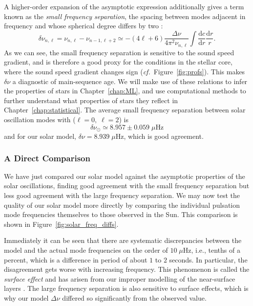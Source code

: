 A higher-order expansion of the asymptotic expression additionally gives a term known as the \emph{small frequency separation}, the spacing between modes adjacent in frequency and whose spherical degree differs by two : 
\begin{equation} \label{eq:dnu}
    \delta\nu_{n,\ell}
    =
    \nu_{n,\ell}
    -
    \nu_{n-1,\ell+2}
    \simeq
    -(4\ell + 6)
    \frac{\Delta\nu}{4\pi^2 \nu_{n,\ell}}
    \int
        \frac{\text{d}c}{\text{d}r}
        \frac{\text{d}r}{r}.
\end{equation}
As we can see, the small frequency separation is sensitive to the sound speed gradient, and is therefore a good proxy for the conditions in the stellar core, where the sound speed gradient changes sign (\emph{cf.}~Figure~\ref{fig:profs}). 
This makes ${\delta\nu}$ a diagnostic of main-sequence age. 
We will make use of these relations to infer the properties of stars in Chapter~\ref{chap:ML}, and use computational methods to further understand what properties of stars they reflect in Chapter~\ref{chap:statistical}. 
The average small frequency separation between solar oscillation modes with (${\ell=0},\;{\ell=2}$) is
\begin{equation}
    \delta\nu_\odot \simeq 8.957 \pm 0.059\;\mu\text{Hz}
\end{equation}
and for our solar model, ${\delta\nu=8.939\;\mu\text{Hz}}$, which is good agreement. 



\subsubsection*{A Direct Comparison} 
We have just compared our solar model against the asymptotic properties of the solar oscillations, finding good agreement with the small frequency separation but less good agreement with the large frequency separation. 
We may now test the quality of our solar model more directly by comparing the individual pulsation mode frequencies themselves to those observed in the Sun. 
This comparison is shown in Figure~\ref{fig:solar_freq_diffs}. 

Immediately it can be seen that there are systematic discrepancies between the model and the actual mode frequencies on the order of ${10\;\mu\text{Hz}}$, i.e., tenths of a percent, which is a difference in period of about $1$ to $2$ seconds. 
In particular, the disagreement gets worse with increasing frequency. 
This phenomenon is called the \emph{surface effect} and has arisen from our improper modelling of the near-surface layers \citep[e.g.,][]{1984srps.conf...11C}. 
The large frequency separation is also sensitive to surface effects, which is why our model ${\Delta\nu}$ differed so significantly from the observed value. 

